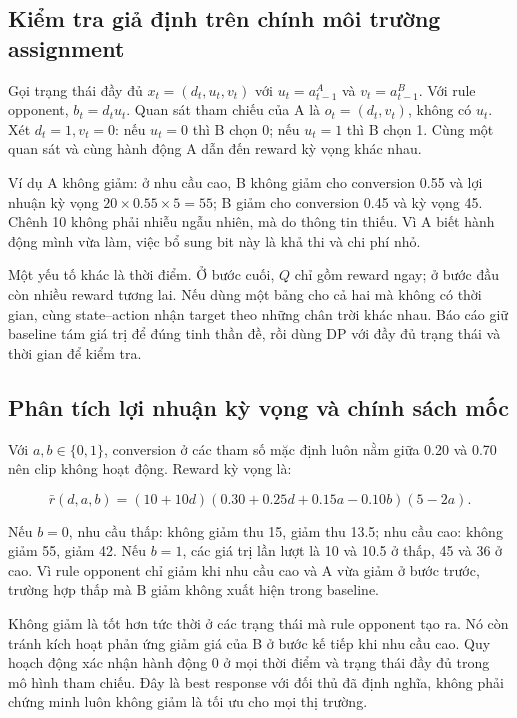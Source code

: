 \subsection{Kiểm tra giả định trên chính môi trường
assignment}\label{kiux1ec3m-tra-giux1ea3-ux111ux1ecbnh-truxean-chuxednh-muxf4i-trux1b0ux1eddng-assignment}

Gọi trạng thái đầy đủ \(x_t=(d_t,u_t,v_t)\) với \(u_t=a^A_{t-1}\) và
\(v_t=a^B_{t-1}\). Với rule opponent, \(b_t=d_tu_t\). Quan sát tham
chiếu của A là \(o_t=(d_t,v_t)\), không có \(u_t\). Xét \(d_t=1,v_t=0\):
nếu \(u_t=0\) thì B chọn 0; nếu \(u_t=1\) thì B chọn 1. Cùng một quan
sát và cùng hành động A dẫn đến reward kỳ vọng khác nhau.

Ví dụ A không giảm: ở nhu cầu cao, B không giảm cho conversion 0.55 và
lợi nhuận kỳ vọng \(20\times0.55\times5=55\); B giảm cho conversion 0.45
và kỳ vọng 45. Chênh 10 không phải nhiễu ngẫu nhiên, mà do thông tin
thiếu. Vì A biết hành động mình vừa làm, việc bổ sung bit này là khả thi
và chi phí nhỏ.

Một yếu tố khác là thời điểm. Ở bước cuối, \(Q\) chỉ gồm reward ngay; ở
bước đầu còn nhiều reward tương lai. Nếu dùng một bảng cho cả hai mà
không có thời gian, cùng state--action nhận target theo những chân trời
khác nhau. Báo cáo giữ baseline tám giá trị để đúng tinh thần đề, rồi
dùng DP với đầy đủ trạng thái và thời gian để kiểm tra.

\subsection{Phân tích lợi nhuận kỳ vọng và chính sách
mốc}\label{phuxe2n-tuxedch-lux1ee3i-nhuux1eadn-kux1ef3-vux1ecdng-vuxe0-chuxednh-suxe1ch-mux1ed1c}

Với \(a,b\in\{0,1\}\), conversion ở các tham số mặc định luôn nằm giữa
0.20 và 0.70 nên clip không hoạt động. Reward kỳ vọng là:

\[\bar r(d,a,b)=(10+10d)(0.30+0.25d+0.15a-0.10b)(5-2a).\]

Nếu \(b=0\), nhu cầu thấp: không giảm thu 15, giảm thu 13.5; nhu cầu
cao: không giảm 55, giảm 42. Nếu \(b=1\), các giá trị lần lượt là 10 và
10.5 ở thấp, 45 và 36 ở cao. Vì rule opponent chỉ giảm khi nhu cầu cao
và A vừa giảm ở bước trước, trường hợp thấp mà B giảm không xuất hiện
trong baseline.

Không giảm là tốt hơn tức thời ở các trạng thái mà rule opponent tạo ra.
Nó còn tránh kích hoạt phản ứng giảm giá của B ở bước kế tiếp khi nhu
cầu cao. Quy hoạch động xác nhận hành động 0 ở mọi thời điểm và trạng
thái đầy đủ trong mô hình tham chiếu. Đây là best response với đối thủ
đã định nghĩa, không phải chứng minh luôn không giảm là tối ưu cho mọi
thị trường.

